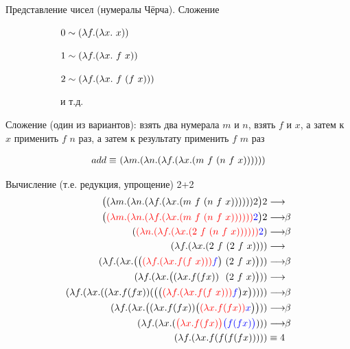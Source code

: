 \begin{frame}{Представление чисел (нумералы Чёрча). Сложение}
\begin{figure}[t]
    \begin{subfigure}[t]{0.35\textwidth}
$ 0 \sim (\lambda f . (\lambda x . \ x))$

$ 1 \sim (\lambda f . (\lambda x . \ f\ x))$

$ 2 \sim (\lambda f . (\lambda x . \ f\ (f\ x)))$

  и т.д.
    \end{subfigure}
    \begin{subfigure}[t]{0.55\textwidth}
    \begin{minipage}{\textwidth}
    \numeralIsFor
    \end{minipage}
    \end{subfigure}
\end{figure}

  \vspace{2em}

  Сложение (один из вариантов): взять два нумерала $m$ и $n$, взять $f$ и $x$, а затем к $x$ применить $f$ $n$ раз, а затем к результату применить $f$ $m$ раз

{\Large \begin{align*}
add \equiv &\ (\lambda m . (\lambda n . (\lambda f . (\lambda x . (m\ f\  (n\ f\  x))))))\\
\end{align*}}
\end{frame}


\begin{frame}{Вычисление (т.е. редукция, упрощение) 2+2}
\def\betaarr{\longrightarrow\!\!\beta}
\def\numTWO{\ensuremath{\lam{f}{\lam{x}{f(f\ x)}}}}
\vspace{-2em}
{\Large
  \begin{align}
    \App{\lam{m}{\lam{n}{\lam{f}{\lam{x}{\app{m\ f\ }{\app{n\ f\ }{x}} }}}}}{2} 2 & \longrightarrow \\
    \Redex{\lam{m}{\lam{n}{\lam{f}{\lam{x}{\app{m\ f\ }{\app{n\ f\ }{x}} }}}}}{2} 2 & \betaarr \\
    \redex{\lam{n}{\lam{f}{\lam{x}{\app{2\ f\ }{\app{n\ f\ }{x}}){}}}}} {2} & \betaarr \\
    \lam{f}{\lam{x}{ \app{2\ f\ }{\app{2\ f\ }{x}}}}   & \longrightarrow \\
    \lam{f}{\lam{x}{ \App{\Redex{\numTWO}{f}\ }{\app{2\ f\ }{x}}}} & \betaarr \\
    \lam{f}{\lam{x}{ \App{\lam{x}{f (f x)} \ \ }{\app{2\ f\ }{x}}}} & \longrightarrow \\
    \lam{f}{\lam{x}{ \app{\lam{x}{f (f x)}} {\app{\App{\Redex{\numTWO}{f}}{x}}}}} & \betaarr \\
    \lam{f}{\lam{x}{ \App{\lam{x}{f (f x)}  } {\Redex{\lam{x}{f (f x)} }{x}}}} & \betaarr \\
    \lam{f}{\lam{x}{ \redex{\Lam{x}{f (f x)}}{\App{f}{\app{f}{x}}}}} & \betaarr \\
    \lam{f}{\lam{x}{ f (f (f (f x)))}} & \equiv 4
  \end{align}}
\end{frame}

